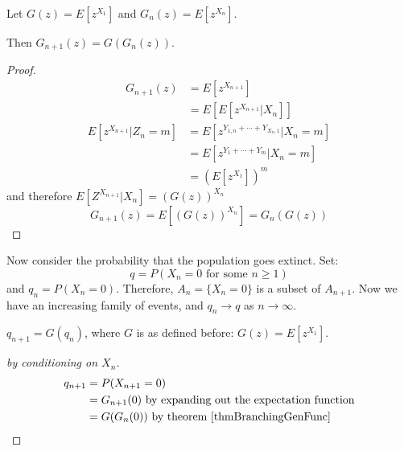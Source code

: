 \documentclass[../Main.tex]{subfiles}
\begin{document}
\begin{theorem}
    Let $G(z) = E[z^{X_1}]$ and $G_n(z) = E[z^{X_n}]$.\par
    Then $G_{n + 1}(z) = G(G_n(z))$.
    \label{thmBranchingGenFunc}
\end{theorem}
\begin{proof}
    \begin{align*}
        G_{n + 1}(z) &= E[z^{X_{n + 1}}] \\
        &= E[E[z^{X_{n+1}} | X_n]]
    \end{align*}
    \begin{align*}
        E[z^{X_{n + 1}} | Z_n = m] &= E[z^{Y_{1, n} + \cdots + Y_{X_n, 1}} | X_n = m] \\
        &= E[z^{Y_1 + \cdots + Y_m} | X_n = m] \\
        &= \left(E[z^{X_1}]\right)^m
    \end{align*}
    and therefore $E[Z^{X_{n + 1}} | X_n] = \left(G(z)\right)^{X_n}$
    \begin{equation*}
        G_{n + 1}(z) = E[\left(G(z)\right)^{X_n}] = G_n(G(z))
    \end{equation*}
\end{proof}
Now consider the probability that the population goes extinct. Set:
\begin{equation*}
    q = P(X_n = 0 \text{ for some } n \geq 1)
\end{equation*}
and $q_n = P(X_n = 0)$. Therefore, $A_n = \{X_n = 0\}$ is a subset of $A_{n + 1}$. Now we have an increasing family of events, and $q_n \to q$ as $n \to \infty$.
\begin{proposition}
    $q_{n + 1} = G(q_n)$, where $G$ is as defined before: $G(z) = E[z^{X_1}]$.
    \label{propExtinctionProb}
\end{proposition}
\begin{proof}[by conditioning on $X_n$]
    \begin{align*}
        q_{n + 1} &= P(X_{n + 1} = 0) \\
        &= G_{n + 1}(0) \text{ by expanding out the expectation function} \\
        &= G(G_n(0)) \text{ by theorem~\ref{thmBranchingGenFunc}}
    \end{align*}
\end{proof}
\end{document}
